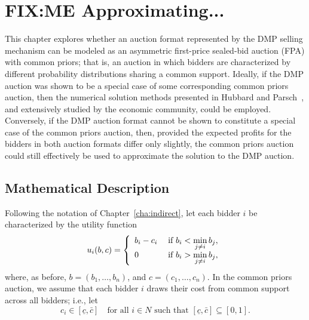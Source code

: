 \chapter{FIX:ME Approximating...}
\label{cha:approximation}

\minitoc
\vspace{10mm}

This chapter explores whether an auction format represented by the DMP selling mechanism can be modeled as an asymmetric first-price sealed-bid auction (FPA) with common priors; that is, an auction in which bidders are characterized by different probability distributions sharing a common support. Ideally, if the DMP auction was shown to be a special case of some corresponding common priors auction, then the numerical solution methods presented in Hubbard and Parsch~\cite{HubbardPaarsch2011}, and extensively studied by the economic community, could be employed. Conversely, if the DMP auction format cannot be shown to constitute a special case of the common priors auction, then, provided the expected profits for the bidders in both auction formats differ only slightly, the common priors auction could still effectively be used to approximate the solution to the DMP auction.

\section{Mathematical Description} %
\label{sec:mathematical_description_approximation}

Following the notation of Chapter~\ref{cha:indirect}, let each bidder $i$ be characterized by the utility function
\begin{equation*}
    u_i(b,c) = \left\{
  \begin{array}{l l}
    b_i-c_i & \;\text{if } b_i < \displaystyle\min_{j\neq i}b_j,\\
    0 & \;\text{if } b_i > \displaystyle\min_{j\neq i}b_j,
  \end{array}\right.
\end{equation*}
where, as before, $b = (b_1,\ldots,b_n)$, and $c = (c_1,\ldots,c_n)$. In the common priors auction, we assume that each bidder $i$ draws their cost from common support across all bidders; i.e., let
\begin{equation*}
  c_i\in [\underline{c}, \bar{c}] \quad\text{for all } i\in N \text{ such that } [\underline{c}, \bar{c}]\subseteq [0, 1].
\end{equation*}

